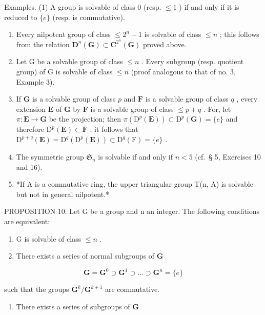 Examples. (1) A group is solvable of class 0 (resp. \(\leqslant 1\) ) if and only if it is reduced to \(\{e\}\) (resp. is commutative).

\begin{enumerate}
\def\labelenumi{(\arabic{enumi})}
\setcounter{enumi}{1}
\item
  Every nilpotent group of class \(\leqslant 2^{n} - 1\) is solvable of class \(\leqslant n\) ; this follows from the relation \(\mathbf{D}^n (\mathbf{G})\subset \mathbf{C}^{2^n}(\mathbf{G})\) proved above.
\item
  Let G be a solvable group of class \(\leqslant n\) . Every subgroup (resp. quotient group) of G is solvable of class \(\leqslant n\) (proof analogous to that of no. 3, Example 3).
\item
  If \(\mathbf{G}\) is a solvable group of class \(p\) and \(\mathbf{F}\) is a solvable group of class \(q\) , every extension \(\mathbf{E}\) of \(\mathbf{G}\) by \(\mathbf{F}\) is a solvable group of class \(\leqslant p + q\) . For, let \(\pi: \mathbf{E} \to \mathbf{G}\) be the projection; then \(\pi(\mathrm{D}^p(\mathbf{E})) \subset \mathrm{D}^p(\mathbf{G}) = \{e\}\) and therefore \(\mathrm{D}^p(\mathbf{E}) \subset \mathbf{F}\) ; it follows that \(\mathrm{D}^{p+q}(\mathbf{E}) = \mathrm{D}^q(\mathrm{D}^p(\mathbf{E})) \subset \mathrm{D}^q(\mathrm{F}) = \{e\}\) .
\item
  The symmetric group \(\mathfrak{S}_n\) is solvable if and only if \(n < 5\) (cf.~§ 5, Exercises 10 and 16).
\item
  *If A is a commutative ring, the upper triangular group T(n, A) is solvable but not in general nilpotent.*
\end{enumerate}

PROPOSITION 10. Let G be a group and n an integer. The following conditions are equivalent:

\begin{enumerate}
\def\labelenumi{(\roman{enumi})}
\item
  G is solvable of class \(\leqslant n\) .
\item
  There exists a series of normal subgroups of \(\mathbf{G}\)
\end{enumerate}

\[
\mathbf {G} = \mathbf {G} ^ {0} \supset \mathbf {G} ^ {1} \supset \dots \supset \mathbf {G} ^ {n} = \{e \}
\]

such that the groups \(\mathbf{G}^k /\mathbf{G}^{k + 1}\) are commutative.

\begin{enumerate}
\def\labelenumi{(\roman{enumi})}
\setcounter{enumi}{2}
\tightlist
\item
  There exists a series of subgroups of \(\mathbf{G}\)
\end{enumerate}

